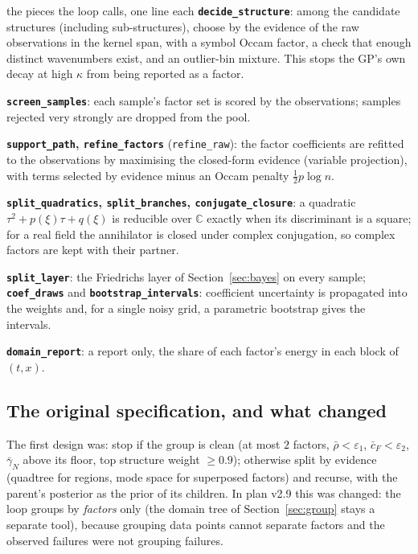 \begin{explained}{the pieces the loop calls, one line each}
\textbf{\texttt{decide\_structure}}: among the candidate structures (including sub-structures), choose by the evidence of the raw observations in the kernel span, with a symbol Occam factor, a check that enough distinct wavenumbers exist, and an outlier-bin mixture. This stops the GP's own decay at high $\kappa$ from being reported as a factor.

\medskip\textbf{\texttt{screen\_samples}}: each sample's factor set is scored by the observations; samples rejected very strongly are dropped from the pool.

\medskip\textbf{\texttt{support\_path}, \texttt{refine\_factors}} (\texttt{refine\_raw}): the factor coefficients are refitted to the observations by maximising the closed-form evidence (variable projection), with terms selected by evidence minus an Occam penalty $\tfrac12p\log n$.

\medskip\textbf{\texttt{split\_quadratics}, \texttt{split\_branches}, \texttt{conjugate\_closure}}: a quadratic $\tau^2+p(\xi)\tau+q(\xi)$ is reducible over $\mathbb C$ exactly when its discriminant is a square; for a real field the annihilator is closed under complex conjugation, so complex factors are kept with their partner.

\medskip\textbf{\texttt{split\_layer}}: the Friedrichs layer of Section~\ref{sec:bayes} on every sample; \textbf{\texttt{coef\_draws}} and \textbf{\texttt{bootstrap\_intervals}}: coefficient uncertainty is propagated into the weights and, for a single noisy grid, a parametric bootstrap gives the intervals.

\medskip\textbf{\texttt{domain\_report}}: a report only, the share of each factor's energy in each block of $(t,x)$.
\end{explained}

\subsection{The original specification, and what changed}
The first design was: stop if the group is clean (at most $2$ factors, $\bar\rho<\varepsilon_1$, $\bar c_F<\varepsilon_2$, $\bar\gamma_N$ above its floor, top structure weight $\ge0.9$); otherwise split by evidence (quadtree for regions, mode space for superposed factors) and recurse, with the parent's posterior as the prior of its children. In plan v2.9 this was changed: the loop groups by \emph{factors} only (the domain tree of Section~\ref{sec:group} stays a separate tool), because grouping data points cannot separate factors and the observed failures were not grouping failures.

